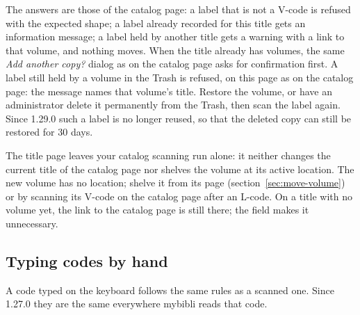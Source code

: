 The answers are those of the catalog page: a label that is not a V-code
is refused with the expected shape; a label already recorded for this
title gets an information message; a label held by another title gets a
warning with a link to that volume, and nothing moves. When the title
already has volumes, the same \emph{Add another copy?} dialog as on the
catalog page asks for confirmation first. A label still held by a
volume in the Trash is refused, on this page as on the catalog page:
the message names that volume's title. Restore the volume, or have an
administrator delete it permanently from the Trash, then scan the label
again. Since 1.29.0 such a label is no longer reused, so that the
deleted copy can still be restored for 30 days.

The title page leaves your catalog scanning run alone: it neither
changes the current title of the catalog page nor shelves the volume at
its active location. The new volume has no location; shelve it from its
page (section~\ref{sec:move-volume}) or by scanning its V-code on the
catalog page after an L-code. On a title with no volume yet, the
link to the catalog page is still there; the field makes it
unnecessary.

\subsection*{Typing codes by hand}
\label{sec:typed-codes}

A code typed on the keyboard follows the same rules as a scanned one.
Since 1.27.0 they are the same everywhere mybibli reads that code.

